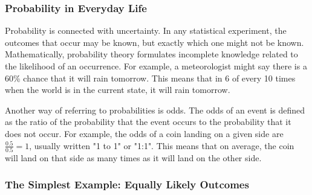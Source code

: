  \label{m39377*cid4}
            \subsubsection{ Probability in Everyday Life}
            \nopagebreak
            
      
      
      \label{m39377*id111785}Probability is connected with uncertainty. In any
statistical experiment, the outcomes that occur may be known, but exactly which
one might not be known. Mathematically, probability theory formulates incomplete
knowledge related to the likelihood of an occurrence. For example, a
meteorologist might say there is a 60\% chance that it will rain tomorrow. This
means that in 6 of every 10 times when the world is in the current state, it
will rain tomorrow.\par 
      
      \label{m39377*id111800}Another way of referring to probabilities is odds. The
odds of an event is defined as the ratio of the probability that the event
occurs to the probability that it does not occur. For example, the odds of a
coin landing on a given side are \begin{math}\frac{0.5}{0.5}=1\end{math}, usually written "1 to 1"
or "1:1". This means that on average, the coin will land on that side as many
times as it will land on the other side.\par 
      \label{m39377*uid36}
            \subsubsection{ The Simplest Example: Equally Likely Outcomes}
            \nopagebreak
            

